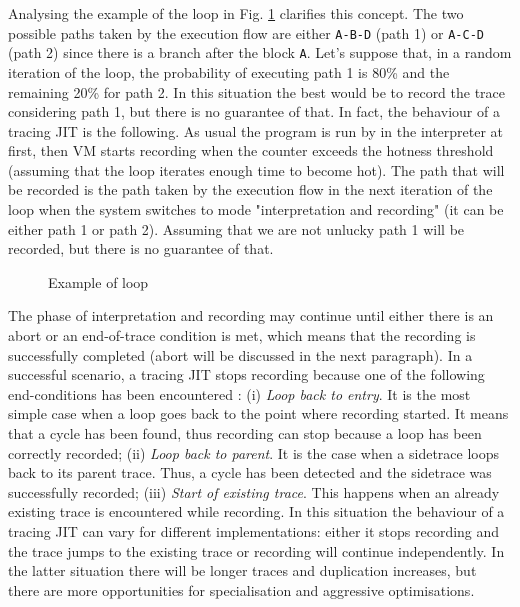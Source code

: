 Analysing the example of the loop in Fig. \ref{fig:recording-speculative} clarifies this concept. The two possible paths taken by the execution flow are either \texttt{A-B-D} (path 1) or \texttt{A-C-D} (path 2) since there is a branch after the block \texttt{A}. Let's suppose that, in a random iteration of the loop, the probability of executing path 1 is 80\% and the remaining 20\% for path 2. In this situation the best would be to record the trace considering path 1, but there is no guarantee of that. In fact, the behaviour of a tracing JIT is the following. As usual the program is run by in the interpreter at first, then VM starts recording when the counter exceeds the hotness threshold (assuming that the loop iterates enough time to become hot). The path that will be recorded is the path taken by the execution flow in the next iteration of the loop when the system switches to mode "interpretation and recording" (it can be either path 1 or path 2). Assuming that we are not unlucky path 1 will be recorded, but there is no guarantee of that.

\begin{figure}[H]
    \hspace*{3cm}
    \vspace*{0cm}
    \caption{Example of loop}
    \label{fig:recording-speculative}
\end{figure}

\noindent
The phase of interpretation and recording may continue until either there is an abort or an end-of-trace condition is met, which means that the recording is successfully completed (abort will be discussed in the next paragraph). In a successful scenario, a tracing JIT stops recording because one of the following end-conditions has been encountered \cite{schilling2013trace}: (i) \textit{Loop back to entry}. It is the most simple case when a loop goes back to the point where recording started. It means that a cycle has been found, thus recording can stop because a loop has been correctly recorded; (ii) \textit{Loop back to parent}. It is the case when a sidetrace loops back to its parent trace. Thus, a cycle has been detected and the sidetrace was successfully recorded; (iii) \textit{Start of existing trace}. This happens when an already existing trace is encountered while recording. In this situation the behaviour of a tracing JIT can vary for different implementations: either it stops recording and the trace jumps to the existing trace or recording will continue independently. In the latter situation there will be longer traces and duplication increases, but there are more opportunities for specialisation and aggressive optimisations. 

